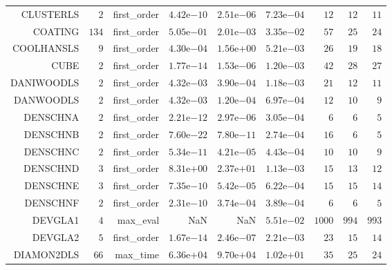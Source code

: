 \begin{longtable}{rrrrrrrrr}
CLUSTERLS & \(     2\) & first\_order & \( 4.42\)e\(-10\) & \( 2.51\)e\(-06\) & \( 7.23\)e\(-04\) & \(    12\) & \(    12\) & \(    11\) \\
COATING & \(   134\) & first\_order & \( 5.05\)e\(-01\) & \( 2.01\)e\(-03\) & \( 3.35\)e\(-02\) & \(    57\) & \(    25\) & \(    24\) \\
COOLHANSLS & \(     9\) & first\_order & \( 4.30\)e\(-04\) & \( 1.56\)e\(+00\) & \( 5.21\)e\(-03\) & \(    26\) & \(    19\) & \(    18\) \\
CUBE & \(     2\) & first\_order & \( 1.77\)e\(-14\) & \( 1.53\)e\(-06\) & \( 1.20\)e\(-03\) & \(    42\) & \(    28\) & \(    27\) \\
DANIWOODLS & \(     2\) & first\_order & \( 4.32\)e\(-03\) & \( 3.90\)e\(-04\) & \( 1.18\)e\(-03\) & \(    21\) & \(    12\) & \(    11\) \\
DANWOODLS & \(     2\) & first\_order & \( 4.32\)e\(-03\) & \( 1.20\)e\(-04\) & \( 6.97\)e\(-04\) & \(    12\) & \(    10\) & \(     9\) \\
DENSCHNA & \(     2\) & first\_order & \( 2.21\)e\(-12\) & \( 2.97\)e\(-06\) & \( 3.05\)e\(-04\) & \(     6\) & \(     6\) & \(     5\) \\
DENSCHNB & \(     2\) & first\_order & \( 7.60\)e\(-22\) & \( 7.80\)e\(-11\) & \( 2.74\)e\(-04\) & \(    16\) & \(     6\) & \(     5\) \\
DENSCHNC & \(     2\) & first\_order & \( 5.34\)e\(-11\) & \( 4.21\)e\(-05\) & \( 4.43\)e\(-04\) & \(    10\) & \(    10\) & \(     9\) \\
DENSCHND & \(     3\) & first\_order & \( 8.31\)e\(+00\) & \( 2.37\)e\(+01\) & \( 1.13\)e\(-03\) & \(    15\) & \(    13\) & \(    12\) \\
DENSCHNE & \(     3\) & first\_order & \( 7.35\)e\(-10\) & \( 5.42\)e\(-05\) & \( 6.22\)e\(-04\) & \(    15\) & \(    15\) & \(    14\) \\
DENSCHNF & \(     2\) & first\_order & \( 2.31\)e\(-10\) & \( 3.74\)e\(-04\) & \( 3.89\)e\(-04\) & \(     6\) & \(     6\) & \(     5\) \\
DEVGLA1 & \(     4\) & max\_eval &       NaN &       NaN & \( 5.51\)e\(-02\) & \(  1000\) & \(   994\) & \(   993\) \\
DEVGLA2 & \(     5\) & first\_order & \( 1.67\)e\(-14\) & \( 2.46\)e\(-07\) & \( 2.21\)e\(-03\) & \(    23\) & \(    15\) & \(    14\) \\
DIAMON2DLS & \(    66\) & max\_time & \( 6.36\)e\(+04\) & \( 9.70\)e\(+04\) & \( 1.02\)e\(+01\) & \(    35\) & \(    25\) & \(    24\) \\

\end{longtable}
